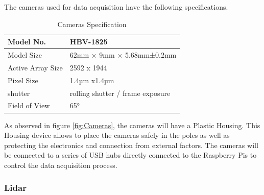 \documentclass[12pt]{report}
\begin{document}
The cameras used for data acquisition have the following specifications. 
\begin{table}[H]
  \begin{tabular}{|l|l|}
  \hline
  Model No.         & HBV-1825                         \\ \hline
  Model Size        & 62mm × 9mm × 5.68mm±0.2mm        \\ \hline
  Active Array Size & 2592 x 1944                      \\ \hline
  Pixel Size        & 1.4µm x1.4µm                     \\ \hline
  shutter           & rolling shutter / frame exposure \\ \hline
  Field of View     & 65°                              \\ \hline
  \end{tabular}
  \captionsetup{singlelinecheck = false, format= hang, justification=raggedright, font=footnotesize, labelsep=space}
  \caption{Cameras Specification}
  \label{tab:Cameras_specs}
\end{table}

As observed in figure \ref{fig:Cameras}, the cameras will have a Plastic Housing. This Housing device allows to place the cameras safely 
in the poles as well as protecting the electronics and connection from external factors.
The cameras will be connected to a series of USB hubs directly connected to the Raspberry Pis to control the data acquisition process.



\subsubsection*{Lidar}
\end{document}

